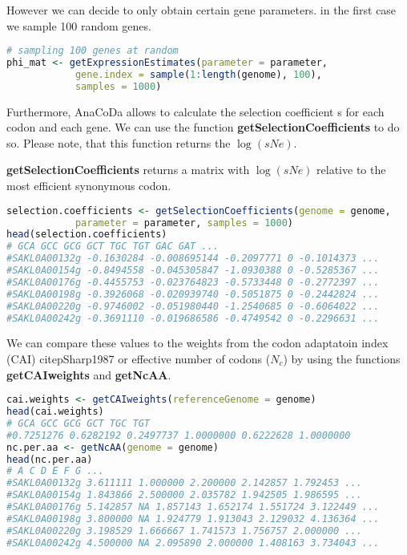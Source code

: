 However we can decide to only obtain certain gene parameters. in the first case we sample 100 random genes.

\begin{lstlisting}[language=R]
# sampling 100 genes at random
phi_mat <- getExpressionEstimates(parameter = parameter,
			gene.index = sample(1:length(genome), 100),
			samples = 1000)
\end{lstlisting}

Furthermore, AnaCoDa allows to calculate the selection coefficient s for each codon and each gene. We can
use the function \textbf{getSelectionCoefficients} to do so. Please note, that this function returns the $\log(sNe)$.

\textbf{getSelectionCoefficients} returns a matrix with $\log(sNe)$ relative to the most efficient synonymous codon.

\begin{lstlisting}[language=R]
selection.coefficients <- getSelectionCoefficients(genome = genome,
			parameter = parameter, samples = 1000)
head(selection.coefficients)
# GCA GCC GCG GCT TGC TGT GAC GAT ...
#SAKL0A00132g -0.1630284 -0.008695144 -0.2097771 0 -0.1014373 ...
#SAKL0A00154g -0.8494558 -0.045305847 -1.0930388 0 -0.5285367 ...
#SAKL0A00176g -0.4455753 -0.023764823 -0.5733448 0 -0.2772397 ...
#SAKL0A00198g -0.3926068 -0.020939740 -0.5051875 0 -0.2442824 ...
#SAKL0A00220g -0.9746002 -0.051980440 -1.2540685 0 -0.6064022 ...
#SAKL0A00242g -0.3691110 -0.019686586 -0.4749542 0 -0.2296631 ...
\end{lstlisting}

We can compare these values to the weights from the codon adaptatoin index (CAI) citep{Sharp1987} or
effective number of codons ($N_c$) \citep{Wright1990} by using the functions \textbf{getCAIweights} and \textbf{getNcAA}.

\begin{lstlisting}[language=R]
cai.weights <- getCAIweights(referenceGenome = genome)
head(cai.weights)
# GCA GCC GCG GCT TGC TGT
#0.7251276 0.6282192 0.2497737 1.0000000 0.6222628 1.0000000
nc.per.aa <- getNcAA(genome = genome)
head(nc.per.aa)
# A C D E F G ...
#SAKL0A00132g 3.611111 1.000000 2.200000 2.142857 1.792453 ...
#SAKL0A00154g 1.843866 2.500000 2.035782 1.942505 1.986595 ...
#SAKL0A00176g 5.142857 NA 1.857143 1.652174 1.551724 3.122449 ...
#SAKL0A00198g 3.800000 NA 1.924779 1.913043 2.129032 4.136364 ...
#SAKL0A00220g 3.198529 1.666667 1.741573 1.756757 2.000000 ...
#SAKL0A00242g 4.500000 NA 2.095890 2.000000 1.408163 3.734043 ...
\end{lstlisting}

